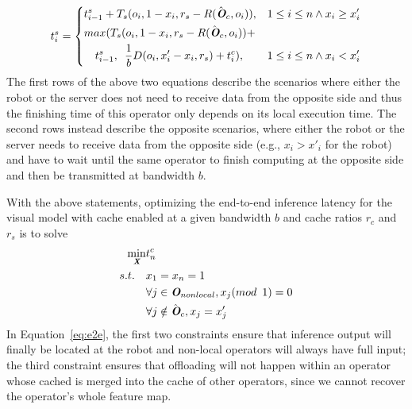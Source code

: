 \begin{equation*}
    t_i^{s} = \left\{
        \begin{aligned}
            &t_{i-1}^{s} + T_s(o_i, 1-x_i, r_s-R(\hat{\textit{\textbf{O}}}_c, o_i)),&&1\le i\le n \land x_i\ge x'_i \\
            &max(T_s(o_i, 1-x_i, r_s-R(\hat{\textit{\textbf{O}}}_c, o_i)) + \\
            & \enspace \enspace t_{i-1}^{s}, \enspace \frac{1}{b} D(o_i, x'_i-x_i,r_s)+ t_i^{c}),&&1\le i\le n \land x_i<x'_i
        \end{aligned}
    \right.
\end{equation*}
The first rows of the above two equations describe the scenarios where either the robot or the server does not need to receive data from the opposite side and thus the finishing time of this operator only depends on its local execution time.
The second rows instead describe the opposite scenarios, where either the robot or the server needs to receive data from the opposite side (e.g., $x_i > x'_i$ for the robot) and have to wait until the same operator to finish computing at the opposite side and then be transmitted at bandwidth $b$.

With the above statements, optimizing the end-to-end inference latency for the visual model with cache enabled at a given bandwidth $b$ and cache ratios $r_c$ and $r_s$ is to solve
\begin{equation}
    \begin{aligned}
        \min\limits_{\textit{\textbf{X}}} & t_n^{c} \\
         s.t. \enspace \enspace&  x_1 = x_n = 1 \\
         & \forall j \in \textit{\textbf{O}}_{nonlocal}, x_j (mod \enspace 1) = 0 \\
         & \forall j \notin \hat{\textit{\textbf{O}}}_c, x_j = x'_j
    \end{aligned}
    \label{eq:e2e}
\end{equation}
In Equation~\ref{eq:e2e}, the first two constraints ensure that inference output will finally be located at the robot and non-local operators will always have full input; the third constraint ensures that offloading will not happen within an operator whose cached is merged into the cache of other operators, since we cannot recover the operator's whole feature map.

